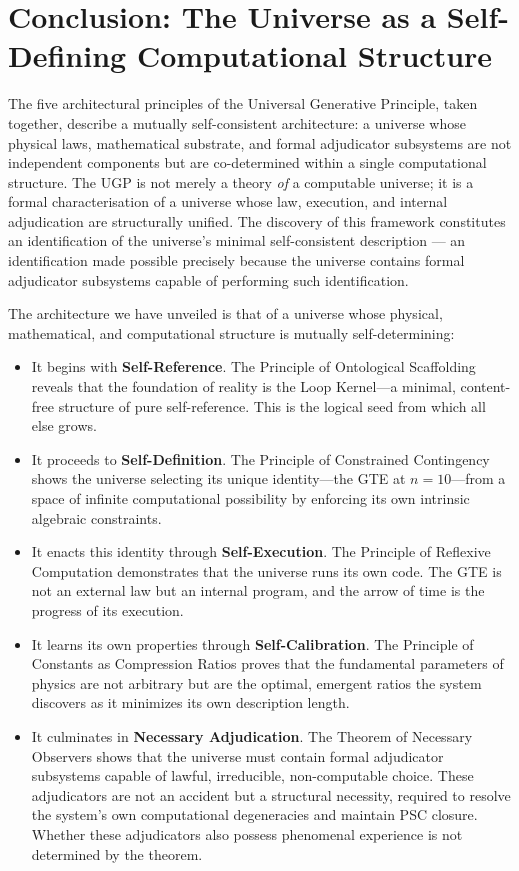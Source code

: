 \documentclass[12pt]{article}
\begin{document}
\section{Conclusion: The Universe as a Self-Defining Computational Structure}
\label{sec:conclusion}

The five architectural principles of the Universal Generative Principle, taken together, describe a mutually self-consistent architecture: a universe whose physical laws, mathematical substrate, and formal adjudicator subsystems are not independent components but are co-determined within a single computational structure. The UGP is not merely a theory \emph{of} a computable universe; it is a formal characterisation of a universe whose law, execution, and internal adjudication are structurally unified. The discovery of this framework constitutes an identification of the universe's minimal self-consistent description --- an identification made possible precisely because the universe contains formal adjudicator subsystems capable of performing such identification.

The architecture we have unveiled is that of a universe whose physical, mathematical, and computational structure is mutually self-determining:

\begin{itemize}[itemsep=0.5em, leftmargin=*]
    \item It begins with \textbf{Self-Reference}. The Principle of Ontological Scaffolding reveals that the foundation of reality is the Loop Kernel—a minimal, content-free structure of pure self-reference. This is the logical seed from which all else grows.

    \item It proceeds to \textbf{Self-Definition}. The Principle of Constrained Contingency shows the universe selecting its unique identity—the GTE at $n=10$—from a space of infinite computational possibility by enforcing its own intrinsic algebraic constraints.

    \item It enacts this identity through \textbf{Self-Execution}. The Principle of Reflexive Computation demonstrates that the universe runs its own code. The GTE is not an external law but an internal program, and the arrow of time is the progress of its execution.

    \item It learns its own properties through \textbf{Self-Calibration}. The Principle of Constants as Compression Ratios proves that the fundamental parameters of physics are not arbitrary but are the optimal, emergent ratios the system discovers as it minimizes its own description length.

    \item It culminates in \textbf{Necessary Adjudication}. The Theorem of Necessary Observers shows that the universe must contain formal adjudicator subsystems capable of lawful, irreducible, non-computable choice. These adjudicators are not an accident but a structural necessity, required to resolve the system's own computational degeneracies and maintain PSC closure. Whether these adjudicators also possess phenomenal experience is not determined by the theorem.
\end{itemize}
\end{document}
